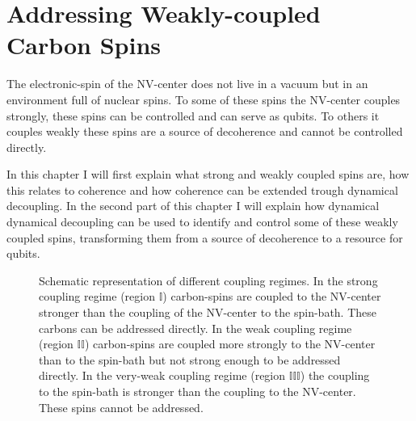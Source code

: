 
\chapter{Addressing Weakly-coupled Carbon Spins}

The electronic-spin of the NV-center does not live in a vacuum but in an environment full of nuclear spins.
To some of these spins the NV-center couples strongly, these spins can be controlled and can serve as qubits.
To others it couples weakly these spins are a source of decoherence and cannot be controlled directly.

In this chapter I will first explain what strong and weakly coupled spins are, how this relates to coherence and how coherence can be extended trough dynamical decoupling.
In the second part of this chapter I will explain how dynamical dynamical decoupling can be used to identify and control some of these weakly coupled spins, transforming them from a source of decoherence to a resource for qubits.

\begin{figure}[htbp]
\centering
    \caption{ Schematic representation of different coupling regimes. In the strong coupling regime (region $\mathbb{I}$) carbon-spins are coupled to the NV-center stronger than the coupling of the NV-center to the spin-bath. These carbons can be addressed directly. In the weak coupling regime (region $\mathbb{II}$) carbon-spins are coupled more strongly to the NV-center than to the spin-bath but not strong enough to be addressed directly. In the very-weak coupling regime (region $\mathbb{III}$) the coupling to the spin-bath is stronger than the coupling to the NV-center. These spins cannot be addressed.}
    \label{fig:coupling regimes}
\end{figure}

